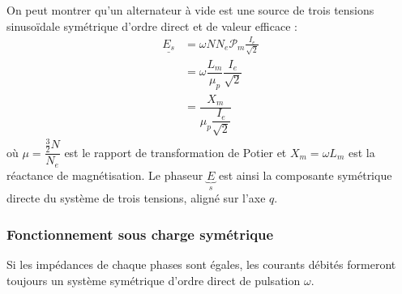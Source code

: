 		On peut montrer qu'un alternateur à vide est une source de trois tensions 
		sinusoïdale symétrique d'ordre direct et de valeur efficace :
		\begin{equation}
		\begin{array}{ll}
		\underline{E_s} &= \omega NN_e\mathcal{P}_m \frac{I_e}{\sqrt{2}}\\
		&= \omega\dfrac{L_m}{\mu_p}\dfrac{I_e}{\sqrt{2}}\\
		&= \dfrac{X_m}{\mu_p\dfrac{I_e}{\sqrt{2}}}
		\end{array}
		\label{eq:Egg}
		\end{equation}
		où $\mu = \dfrac{\frac{3}{2}N}{N_e}$ est le rapport de transformation de 
		Potier et $X_m = \omega L_m$ est la réactance de magnétisation. Le phaseur
		$\underbrace{E}_s$ est ainsi la composante symétrique directe du système de 
		trois tensions, aligné sur l'axe $q$.
		
		
		\subsubsection{Fonctionnement sous charge symétrique}
		Si les impédances de chaque phases sont égales, les courants débités 
		formeront toujours un système symétrique d'ordre direct de pulsation 
		$\omega$.\\
		

